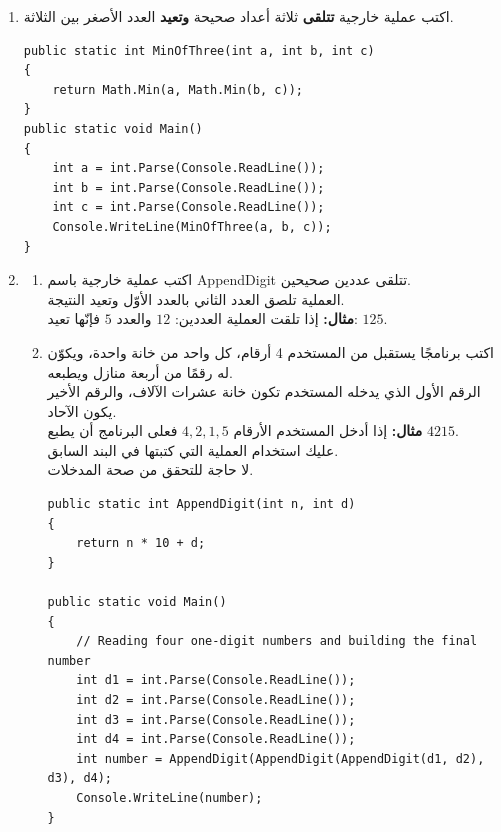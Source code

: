 ﻿\documentclass[12pt]{article}
\begin{document}
\begin{enumerate}[itemsep=3em]
\begin{enumerate}
\item اكتب عملية خارجية \textbf{تتلقى} ثلاثة أعداد صحيحة \textbf{وتعيد} العدد الأصغر بين الثلاثة.
\ifwithsols
\begin{boxSolution}
\begin{english}
\begin{verbatim}
public static int MinOfThree(int a, int b, int c)
{
    return Math.Min(a, Math.Min(b, c));
}
public static void Main()
{
    int a = int.Parse(Console.ReadLine());
    int b = int.Parse(Console.ReadLine());
    int c = int.Parse(Console.ReadLine());
    Console.WriteLine(MinOfThree(a, b, c));
}
\end{verbatim}
\end{english}
\end{boxSolution}
\fi



\clearpage

\item
\begin{enumerate}
    \item اكتب عملية خارجية باسم \textenglish{AppendDigit} تتلقى عددين صحيحين. \\
    العملية تلصق العدد الثاني بالعدد الأوّل وتعيد النتيجة. \\
    \textbf{مثال:} إذا تلقت العملية العددين: $12$ والعدد $5$ فإنّها تعيد: $125$.
    \item اكتب برنامجًا يستقبل من المستخدم 4 أرقام، كل واحد من خانة واحدة، ويكوّن له رقمًا من أربعة منازل ويطبعه. \\
    الرقم الأول الذي يدخله المستخدم تكون خانة عشرات الآلاف، والرقم الأخير يكون الآحاد. \\
    \textbf{مثال:} إذا أدخل المستخدم الأرقام $4,2,1,5$ فعلى البرنامج أن يطبع $4215$. \\
    عليك استخدام العملية التي كتبتها في البند السابق. \\
    لا حاجة للتحقق من صحة المدخلات.
\ifwithsols
\begin{boxSolution}
\begin{english}
\begin{verbatim}
public static int AppendDigit(int n, int d)
{
    return n * 10 + d;
}

public static void Main()
{
    // Reading four one-digit numbers and building the final number
    int d1 = int.Parse(Console.ReadLine());
    int d2 = int.Parse(Console.ReadLine());
    int d3 = int.Parse(Console.ReadLine());
    int d4 = int.Parse(Console.ReadLine());
    int number = AppendDigit(AppendDigit(AppendDigit(d1, d2), d3), d4);
    Console.WriteLine(number);
}
\end{verbatim}
\end{english}
\end{boxSolution}
\fi



\end{enumerate}
\end{enumerate}
\end{enumerate}
\end{document}
